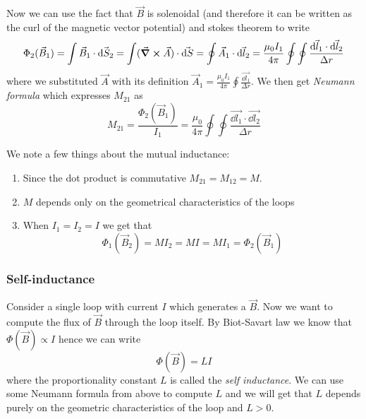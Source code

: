\documentclass[12pt]{extarticle}
\begin{document}
Now we can use the fact that $\vec B$ is solenoidal (and therefore it can be written as the curl of the magnetic vector potential)
and stokes theorem to write
\begin{equation}
	\Phi_2(\vec B_1) = \int \vec B_1 \cdot \vec{\dd S_2} = \int (\curl \vec A) \cdot \vec{\dd S}
	= \oint \vec A_1 \cdot \vec{\dd l_2} = \frac{\mu_0 I_1}{4 \pi} \oint \oint \frac{\vec{\dd l_1} \cdot \vec{\dd l_2}}{\Delta r}
\end{equation}
where we substituted $\vec A$ with its definition $\vec A_1 = \frac{\mu_0 I_1}{4 \pi} \oint \frac{\vec{\dd l_1}}{\Delta r}$.
We then get \emph{Neumann formula} which expresses $M_{21}$ as
\begin{equation}
	M_{21} = \frac{\Phi_2(\vec B_1)}{I_1} = \frac{\mu_0 }{4 \pi} \oint \oint \frac{\vec{\dd l_1} \cdot \vec{\dd l_2}}{\Delta r}
\end{equation}

We note a few things about the mutual inductance:
\begin{enumerate}
	\item Since the dot product is commutative $M_{21} = M_{12} = M$.
	\item $M$ depends only on the geometrical characteristics of the loops
	\item When $I_1 = I_2 = I$ we get that
	      \begin{equation}
		      \Phi_1(\vec B_2) = M I_2 = MI = M I_1 = \Phi_2(\vec B_1)
	      \end{equation}
\end{enumerate}

\subsubsection{Self-inductance}

Consider a single loop with current $I$ which generates a $\vec B$.
Now we want to compute the flux of $\vec B$ through the loop itself.
By Biot-Savart law we know that $\Phi(\vec B) \propto I$ hence we can write
\begin{equation}
	\Phi(\vec B) = L I
\end{equation}
where the proportionality constant $L$ is called the \emph{self inductance}.
We can use some Neumann formula from above to compute $L$ and we will get that $L$
depends purely on the geometric characteristics of the loop and $L > 0$.
\end{document}
